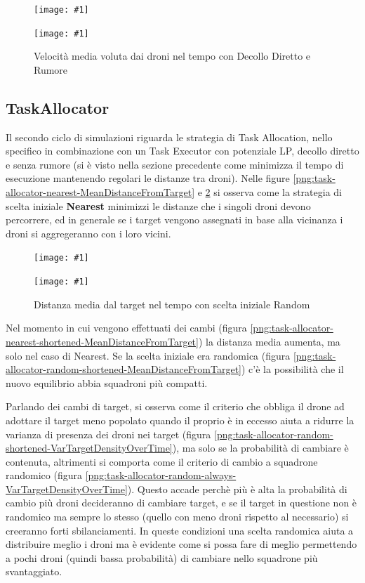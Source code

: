 \documentclass[a4paper,11pt,oneside, table]{article}
\newcommand{\putsubimage}[5] {
  \begin{minipage}{{#4}\linewidth}
	    \centering
      \texttt{[image: \#1]}
	    \caption{#2}\label{#3}
	\end{minipage}
}
\newcommand{\putimagecouple}[2] {
  \begin{figure}[!htb]
      \centering
      #1
      \hspace{0.5cm}
      #2
  \end{figure}
}
\begin{document}
\putimagecouple
{\putsubimage{images/experiments/task-executor-noisy-vertical/MeanSpeed.png}{Velocit\`a media voluta dai droni nel tempo con Decollo Verticale e Rumore}{png:task-executor-noisy-vertical-MeanSpeed}{0.4}{0.99}}
{\putsubimage{images/experiments/task-executor-noisy-direct/MeanSpeed.png}{Velocit\`a media voluta dai droni nel tempo con Decollo Diretto e Rumore}{png:task-executor-noisy-direct-MeanSpeed}{0.4}{0.99}}

\subsection{TaskAllocator}

Il secondo ciclo di simulazioni riguarda le strategia di Task Allocation, nello specifico in combinazione con un Task Executor con potenziale LP, decollo diretto e senza rumore (si \`e visto nella sezione precedente come minimizza il tempo di esecuzione mantenendo regolari le distanze tra droni).
Nelle figure \ref{png:task-allocator-nearest-MeanDistanceFromTarget} e \ref{png:task-allocator-random-MeanDistanceFromTarget} si osserva come la strategia di scelta iniziale \textbf{Nearest} minimizzi le distanze che i singoli droni devono percorrere, ed in generale se i target vengono assegnati in base alla vicinanza i droni si aggregeranno con i loro vicini.

\putimagecouple
{\putsubimage{images/experiments/task-allocator-nearest/MeanDistanceFromTarget.png}{Distanza media dal target nel tempo con scelta iniziale Nearest}{png:task-allocator-nearest-MeanDistanceFromTarget}{0.4}{0.99}}
{\putsubimage{images/experiments/task-allocator-random/MeanDistanceFromTarget.png}{Distanza media dal target nel tempo con scelta iniziale Random}{png:task-allocator-random-MeanDistanceFromTarget}{0.4}{0.99}}

Nel momento in cui vengono effettuati dei cambi (figura \ref{png:task-allocator-nearest-shortened-MeanDistanceFromTarget}) la distanza media aumenta, ma solo nel caso di Nearest. Se la scelta iniziale era randomica (figura \ref{png:task-allocator-random-shortened-MeanDistanceFromTarget}) c'\`e la possibilit\`a che il nuovo equilibrio abbia squadroni pi\`u compatti.

Parlando dei cambi di target, si osserva come il criterio che obbliga il drone ad adottare il target meno popolato quando il proprio \`e in eccesso aiuta a ridurre la varianza di presenza dei droni nei target (figura \ref{png:task-allocator-random-shortened-VarTargetDensityOverTime}), ma solo se la probabilit\`a di cambiare \`e contenuta, altrimenti si comporta come il criterio di cambio a squadrone randomico (figura \ref{png:task-allocator-random-always-VarTargetDensityOverTime}).
Questo accade perch\`e pi\`u \`e alta la probabilit\`a di cambio pi\`u droni decideranno di cambiare target, e se il target in questione non \`e randomico ma sempre lo stesso (quello con meno droni rispetto al necessario) si creeranno forti sbilanciamenti. In queste condizioni una scelta randomica aiuta a distribuire meglio i droni ma \`e evidente come si possa fare di meglio permettendo a pochi droni (quindi bassa probabilit\`a) di cambiare nello squadrone pi\`u svantaggiato.
\end{document}
